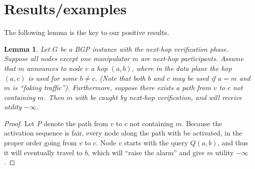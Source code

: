 \documentclass[10pt]{article}
\newtheorem{lemma}{Lemma}
\begin{document}
\section{Results/examples}

  The following lemma is the key to our positive results.
  \begin{lemma}
    Let $G$ be a BGP instance with the next-hop verification phase.
    Suppose all nodes except one manipulator $m$ are next-hop participants.
    Assume that $m$ announces to node $v$ a hop $(a,b)$, where in the data plane the
    hop $(a,c)$ is used for some $b\ne c$.
    (Note that both $b$ and $c$ may be used if $a=m$ and $m$ is ``faking traffic'').
    Furthermore, suppose there exists a path from $v$ to $c$ not containing $m$.
    Then $m$ with be caught by next-hop verification, and will
    receive utility $-\infty$.
  \end{lemma}
  \begin{proof}
    Let $P$ denote the path from $v$ to $c$ not containing $m$.
    Because the activation sequence is fair, every node along the path with
    be activated, in the proper order going from $v$ to $c$.
    Node $v$ starts with the query $Q(a,b)$, and thus it will eventually travel
    to $b$, which will ``raise the alarm'' and give $m$ utility $-\infty$.
  \end{proof}
\end{document}
